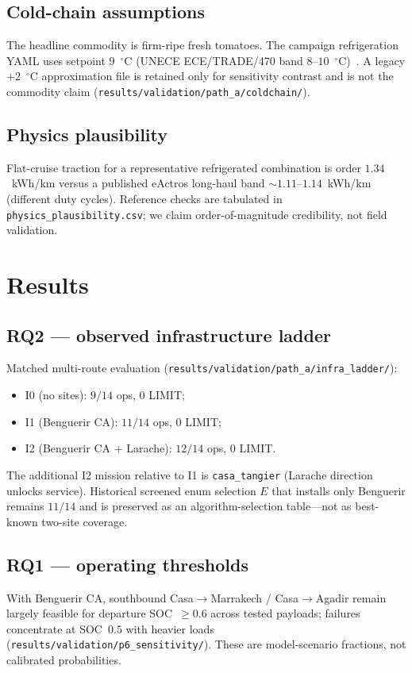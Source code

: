 \documentclass[review,12pt]{elsarticle}
\begin{document}
\subsection{Cold-chain assumptions}
The headline commodity is firm-ripe fresh tomatoes.
The campaign refrigeration YAML uses setpoint $9$~$^{\circ}$C (UNECE ECE/TRADE/470 band $8$--$10$~$^{\circ}$C)~\cite{UNECETomato2023}.
A legacy $+2$~$^{\circ}$C approximation file is retained only for sensitivity contrast and is not the commodity claim
(\texttt{results/validation/path\_a/coldchain/}).

\subsection{Physics plausibility}
Flat-cruise traction for a representative refrigerated combination is order $1.34$~kWh/km versus a published eActros long-haul band $\sim 1.11$--$1.14$~kWh/km (different duty cycles).
Reference checks are tabulated in \texttt{physics\_plausibility.csv}; we claim order-of-magnitude credibility, not field validation.

\section{Results}
\label{sec:results}

\subsection{RQ2 --- observed infrastructure ladder}
Matched multi-route evaluation
(\texttt{results/validation/path\_a/infra\_ladder/}):
\begin{itemize}
\item I0 (no sites): $9/14$ ops, $0$ LIMIT;
\item I1 (Benguerir CA): $11/14$ ops, $0$ LIMIT;
\item I2 (Benguerir CA + Larache): $12/14$ ops, $0$ LIMIT.
\end{itemize}
The additional I2 mission relative to I1 is \texttt{casa\_tangier} (Larache direction unlocks service).
Historical screened enum selection $E$ that installs only Benguerir remains $11/14$ and is preserved as an algorithm-selection table---not as best-known two-site coverage.

\subsection{RQ1 --- operating thresholds}
With Benguerir CA, southbound Casa$\rightarrow$Marrakech / Casa$\rightarrow$Agadir remain largely feasible for departure SOC~$\ge 0.6$ across tested payloads;
failures concentrate at SOC~$0.5$ with heavier loads
(\texttt{results/validation/p6\_sensitivity/}).
These are model-scenario fractions, not calibrated probabilities.
\end{document}
